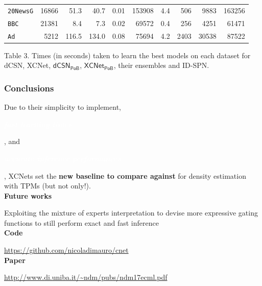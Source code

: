\documentclass[xcolor={usenames,dvipsnames,svgnames}, compress]{beamer}
\newcommand{\highlighttext}[2][yellow]{{\colorbox{#1}{\strut\textcolor{white}{#2}}}}
\begin{document}
\begin{frame}[t]
\begin{table}[t]
\begin{tabular}{l rrr r r r r r r}
    \texttt{20NewsG}&16866&51.3&40.7&	0.01&153908&4.4& 506& 9883&163256\\ 
    \texttt{BBC}&21381&8.4&7.3&	0.02&69572&0.4& 256& 4251 &61471\\ 
    \texttt{Ad}&5212&116.5&134.0&	0.08&\cellcolor{gold6}\color{white}75694&4.2&\cellcolor{gold6}\color{white}2403 &\cellcolor{gold6}\color{white} 30538 &\cellcolor{gold6}\color{white}87522\\ 
    \bottomrule
  \end{tabular}
  \label{tab:exptimes}
\end{table}\vspace{-10pt}
\hspace{30pt}\begin{minipage}{0.8\linewidth}
 \tiny Table 3. Times (in seconds) taken to learn the best models on each dataset
for \textsf{dCSN}, \textsf{XCNet}, $\mathsf{dCSN_{PoB}}$, $\mathsf{XCNet_{PoB}}$, their ensembles
and \textsf{ID-SPN}.
\end{minipage}
\end{frame}

\begin{frame}[t]
  \frametitle{Conclusions}
  \small
  

  Due to their simplicity to implement, \highlighttext[gold4]{\textbf{\emph{fast learning times}}}, and \highlighttext[lacamlilac]{\emph{\textbf{accurate
inference performances}}}, XCNets set the \textbf{new baseline to compare against} for density
estimation with TPMs (but not only!).\\[20pt]

\textbf{\normalsize Future works}\par 
Exploiting the mixture of
experts interpretation to devise more expressive gating functions
to still perform exact and fast inference\\[20pt]

\textbf{\normalsize Code}\par 
\url{https://github.com/nicoladimauro/cnet}\\[10pt]

\textbf{\normalsize Paper}\par 
\url{http://www.di.uniba.it/~ndm/pubs/ndm17ecml.pdf}

\end{frame}
\end{document}
